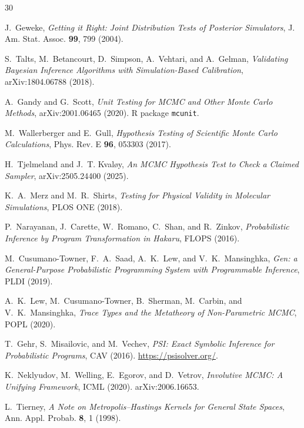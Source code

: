 \documentclass[11pt,a4paper]{article}
\begin{document}
\begin{thebibliography}{30}

J.~Geweke, \textit{Getting it Right: Joint Distribution Tests of Posterior Simulators}, J. Am. Stat. Assoc. \textbf{99}, 799 (2004).

S.~Talts, M.~Betancourt, D.~Simpson, A.~Vehtari, and A.~Gelman, \textit{Validating Bayesian Inference Algorithms with Simulation-Based Calibration}, arXiv:1804.06788 (2018).

A.~Gandy and G.~Scott, \textit{Unit Testing for MCMC and Other Monte Carlo Methods}, arXiv:2001.06465 (2020). R package \texttt{mcunit}.

M.~Wallerberger and E.~Gull, \textit{Hypothesis Testing of Scientific Monte Carlo Calculations}, Phys. Rev. E \textbf{96}, 053303 (2017).

H.~Tjelmeland and J.~T. Kvaløy, \textit{An MCMC Hypothesis Test to Check a Claimed Sampler}, arXiv:2505.24400 (2025).

K.~A.~Merz and M.~R.~Shirts, \textit{Testing for Physical Validity in Molecular Simulations}, PLOS ONE (2018).

P.~Narayanan, J.~Carette, W.~Romano, C.~Shan, and R.~Zinkov, \textit{Probabilistic Inference by Program Transformation in Hakaru}, FLOPS (2016).

M.~Cusumano-Towner, F.~A.~Saad, A.~K.~Lew, and V.~K.~Mansinghka, \textit{Gen: a General-Purpose Probabilistic Programming System with Programmable Inference}, PLDI (2019).

A.~K.~Lew, M.~Cusumano-Towner, B.~Sherman, M.~Carbin, and V.~K.~Mansinghka, \textit{Trace Types and the Metatheory of Non-Parametric MCMC}, POPL (2020).

T.~Gehr, S.~Misailovic, and M.~Vechev, \textit{PSI: Exact Symbolic Inference for Probabilistic Programs}, CAV (2016). \url{https://psisolver.org/}.

K.~Neklyudov, M.~Welling, E.~Egorov, and D.~Vetrov, \textit{Involutive MCMC: A Unifying Framework}, ICML (2020). arXiv:2006.16653.

L.~Tierney, \textit{A Note on Metropolis--Hastings Kernels for General State Spaces}, Ann. Appl. Probab. \textbf{8}, 1 (1998).


\end{thebibliography}
\end{document}
